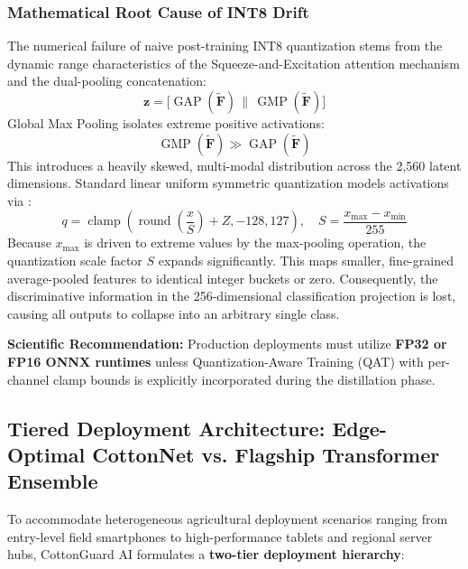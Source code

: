 \documentclass[journal,10pt,twocolumn]{IEEEtran}
\begin{document}
\subsubsection{Mathematical Root Cause of INT8 Drift}
The numerical failure of naive post-training INT8 quantization stems from the dynamic range characteristics of the Squeeze-and-Excitation attention mechanism and the dual-pooling concatenation:
\begin{equation}
\mathbf{z} = \Big[ \operatorname{GAP}(\widetilde{\mathbf{F}}) \,\|\, \operatorname{GMP}(\widetilde{\mathbf{F}}) \Big]
\end{equation}
Global Max Pooling isolates extreme positive activations:
\begin{equation}
\operatorname{GMP}(\widetilde{\mathbf{F}}) \gg \operatorname{GAP}(\widetilde{\mathbf{F}})
\end{equation}
This introduces a heavily skewed, multi-modal distribution across the 2,560 latent dimensions. Standard linear uniform symmetric quantization models activations via \cite{jacob2018quantization}:
\begin{equation}
q = \operatorname{clamp}\left( \operatorname{round}\left( \frac{x}{S} \right) + Z, -128, 127 \right), \quad S = \frac{x_{\max} - x_{\min}}{255}
\end{equation}
Because $x_{\max}$ is driven to extreme values by the max-pooling operation, the quantization scale factor $S$ expands significantly. This maps smaller, fine-grained average-pooled features to identical integer buckets or zero. Consequently, the discriminative information in the 256-dimensional classification projection is lost, causing all outputs to collapse into an arbitrary single class.

\textbf{Scientific Recommendation:} Production deployments must utilize \textbf{FP32 or FP16 ONNX runtimes} unless Quantization-Aware Training (QAT) \cite{krishnamoorthi2018quantizing} with per-channel clamp bounds is explicitly incorporated during the distillation phase.

\subsection{Tiered Deployment Architecture: Edge-Optimal CottonNet vs. Flagship Transformer Ensemble}
To accommodate heterogeneous agricultural deployment scenarios ranging from entry-level field smartphones to high-performance tablets and regional server hubs, CottonGuard AI formulates a \textbf{two-tier deployment hierarchy}:
\end{document}
